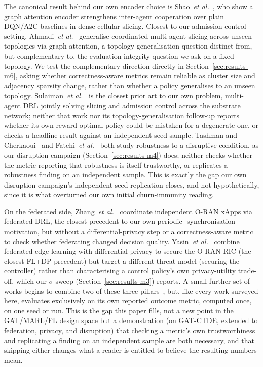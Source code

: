 \documentclass[pdflatex,sn-basic,Numbered]{sn-jnl}%
\begin{document}
The canonical result behind our own encoder choice is
Shao~\emph{et al.}~\cite{shao2021gatmarl}, who show a graph attention
encoder strengthens inter-agent cooperation over plain DQN/A2C
baselines in dense-cellular slicing. Closest to our admission-control setting, Ahmadi~\emph{et al.}~\cite{ahmadi2024generalizable} generalise coordinated multi-agent slicing across unseen topologies via graph attention, a topology-generalisation question distinct from, but complementary to, the evaluation-integrity question we ask on a fixed topology. We test the complementary direction directly in Section~\ref{sec:results-m6}, asking whether correctness-aware metrics remain reliable as cluster size and adjacency sparsity change, rather than whether a policy generalises to an unseen topology. Sulaiman~\emph{et
al.}~\cite{sulaiman2023coordinated} is the closest prior art to our own
problem, multi-agent DRL jointly solving slicing and admission control
across the substrate network; neither that work nor its
topology-generalisation follow-up reports whether its own
reward-optimal policy could be mistaken for a degenerate one, or
checks a headline result against an independent seed sample. Tashman and Cherkaoui~\cite{tashman2026adversarial} and Fatehi~\emph{et al.}~\cite{fatehi2026attentionmarl} both study robustness to a disruptive condition, as our disruption campaign (Section~\ref{sec:results-m4}) does; neither checks whether the metric reporting that robustness is itself trustworthy, or replicates a robustness finding on an independent sample. This is exactly the gap our own disruption campaign's independent-seed replication closes, and not hypothetically, since it is what overturned our own initial churn-immunity reading.

On the federated side, Zhang~\emph{et
al.}~\cite{zhang2022federatedoran} coordinate independent O-RAN xApps
via federated DRL, the closest precedent to our own periodic-
synchronisation motivation, but without a differential-privacy step or
a correctness-aware metric to check whether federating changed
decision quality. Yasin~\emph{et al.}~\cite{yasin2025dpfl} combine federated edge learning with differential privacy to secure the O-RAN RIC (the closest FL+DP precedent) but target a different threat model (securing the controller) rather than characterising a control policy's own privacy-utility trade-off, which our $\sigma$-sweep (Section~\ref{sec:results-m3}) reports. A small further set of works
begins to combine two of these three
pillars~\cite{mohajer2026pronto,bouroudi2025gnnmarl,qasim2025tgnnfl,gong2026femaddpg},
but, like every work surveyed here, evaluates exclusively on its own
reported outcome metric, computed once, on one seed or run. This is the gap this paper fills, not a new point in the GAT/MARL/FL design space but a demonstration (on GAT-CTDE, extended to federation, privacy, and disruption) that checking a metric's own trustworthiness and replicating a finding on an independent sample are both necessary, and that skipping either changes what a reader is entitled to believe the resulting numbers mean.
\end{document}
